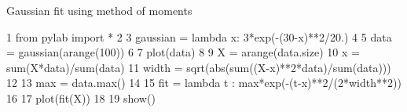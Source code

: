 Gaussian fit using method of moments

   1 from pylab import *
   2 
   3 gaussian = lambda x: 3*exp(-(30-x)**2/20.)
   4 
   5 data = gaussian(arange(100))
   6 
   7 plot(data)
   8 
   9 X = arange(data.size)
  10 x = sum(X*data)/sum(data)
  11 width = sqrt(abs(sum((X-x)**2*data)/sum(data)))
  12 
  13 max = data.max()
  14 
  15 fit = lambda t : max*exp(-(t-x)**2/(2*width**2))
  16 
  17 plot(fit(X))
  18 
  19 show()
